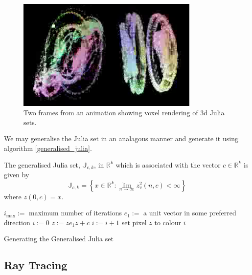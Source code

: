 \begin{figure}
\centering
\includegraphics[width=0.8\textwidth]{3djulia_pair}
\caption{\label{fig:3djulia}
  Two frames from an animation\cite{FRAC:JuliaAnimation} showing voxel
          rendering of 3d Julia sets.}
\end{figure}

We may generalise the Julia set in an analagous manner and generate it
using algorithm \ref{generalised_julia}.

\begin{definition}
The generalised Julia set, $\mathbb{J}_{c,k}$, in $\mathbb{R}^k$
which is associated with the vector $c \in \mathbb{R}^k$ is given by
\[
\mathbb{J}_{c,k} = 
\left\{x \in \mathbb{R}^k
: \lim_{n \rightarrow \infty} z_v^2(n,c) < \infty \right\} 
\]
where $z(0,c) = x$.
\end{definition}

\begin{fancyalg}
\begin{algorithmic}[1]
\STATE $i_{\mbox{max}} :=$ maximum number of iterations
\STATE $e_1 :=$ a unit vector in some preferred direction
\STATE $i := 0$
  \STATE $z := ze_1z + c$
  \STATE $i := i+1$
\ENDWHILE 
\STATE set pixel $z$ to colour $i$
\ENDFOR
\end{algorithmic}
\caption{
\label{alg:generalised_julia}
  Generating the Generalised Julia set}
\end{fancyalg}



\subsection{Ray Tracing}

